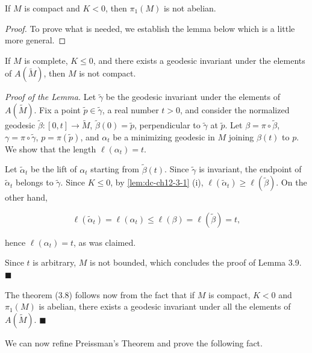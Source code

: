 \begin{theorem}
  \label{thm:dc-ch12-3-8}
  If $M$ is compact and $K<0$, then $\pi_1(M)$ is not abelian.
\end{theorem}
\begin{proof}
  To prove what is needed, we establish the lemma below which is a little
  more general.
\end{proof}

\begin{lemma}
  \label{lem:dc-ch12-3-9}
  If $M$ is complete, $K\leq 0$, and there exists a geodesic invariant under the
  elements of $A(\tilde{M})$, then $M$ is not compact.
  
  \emph{Proof of the Lemma.} Let $\tilde{\gamma}$ be the geodesic invariant under the
  elements of $A(\tilde{M})$. Fix a point $\tilde{p}\in\tilde{\gamma}$, a real
  number $t>0$, and consider the normalized geodesic $\tilde{\beta}:[0,t]\to\tilde{M}$,
  $\tilde{\beta}(0)=\tilde{p}$, perpendicular to $\tilde{\gamma}$ at $\tilde{p}$.
  Let $\beta=\pi\circ\tilde{\beta}$, $\gamma=\pi\circ\tilde{\gamma}$,
  $p=\pi(\tilde{p})$, and $\alpha_t$ be a minimizing geodesic in $M$ joining
  $\beta(t)$ to $p$. We show that the length $\ell(\alpha_t)=t$.
  
  Let $\tilde{\alpha}_t$ be the lift of $\alpha_t$ starting from $\tilde{\beta}(t)$.
  Since $\tilde{\gamma}$ is invariant, the endpoint of $\tilde{\alpha}_t$ belongs to
  $\tilde{\gamma}$. Since $K\leq 0$, by \cref{lem:dc-ch12-3-1} (i),
  $\ell(\tilde{\alpha}_t)\geq\ell(\tilde{\beta})$. On the other hand,
  
  $$
  \ell(\tilde{\alpha}_t)=\ell(\alpha_t)\leq\ell(\beta)=\ell(\tilde{\beta})=t,
  $$
  
  hence $\ell(\alpha_t)=t$, as was claimed.
  
  Since $t$ is arbitrary, $M$ is not bounded, which concludes the proof of Lemma
  3.9. $\blacksquare$
  
  The theorem (3.8) follows now from the fact that if $M$ is compact, $K<0$ and
  $\pi_1(M)$ is abelian, there exists a geodesic invariant under all the elements of
  $A(\tilde{M})$. $\blacksquare$
  
  We can now refine Preissman's Theorem and prove the following fact.
\end{lemma}

